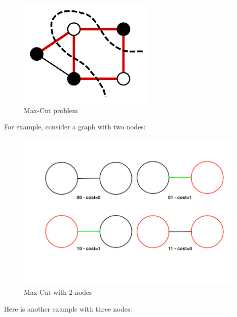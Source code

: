 \documentclass{article}
\begin{document}
\begin{multicols}{2}
\begin{figure}[H]
    \centering
    \includegraphics[width = \columnwidth]{fig/Max_Cut.png}
    \caption{Max-Cut problem}
    \label{fig:Max_cut_edge}
\end{figure}

For example, consider a graph with two nodes:

\begin{figure}[H]
    \centering
    \includegraphics[width = \columnwidth]{fig/02_2_nodes_cuts.png}
    \caption{Max-Cut with 2 nodes}
    \label{fig:Max_cut_edge_2}
\end{figure}

Here is another example with three nodes:


\end{multicols}
\end{document}
